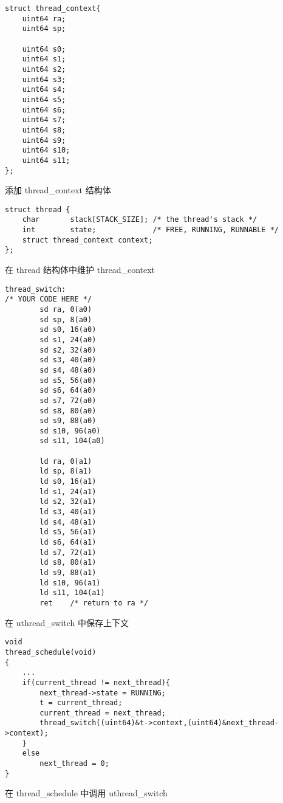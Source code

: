 \begin{listing}[!htb]
	\begin{verbatim}
struct thread_context{
    uint64 ra;
    uint64 sp;
    
    uint64 s0;
    uint64 s1;
    uint64 s2;
    uint64 s3;
    uint64 s4;
    uint64 s5;
    uint64 s6;
    uint64 s7;
    uint64 s8;
    uint64 s9;
    uint64 s10;
    uint64 s11;
};
	\end{verbatim}
	\caption{添加 thread\_context 结构体}\label{lst:add_struct_thread_context}
\end{listing}

\begin{listing}[!htb]
	\begin{verbatim}
struct thread {
    char       stack[STACK_SIZE]; /* the thread's stack */
    int        state;             /* FREE, RUNNING, RUNNABLE */
    struct thread_context context;
};
	\end{verbatim}
	\caption{在 thread 结构体中维护 thread\_context}\label{lst:add_thread_context_to_thread}
\end{listing}

\begin{listing}[!htb]
	\begin{verbatim}
thread_switch:
/* YOUR CODE HERE */
        sd ra, 0(a0)
        sd sp, 8(a0)
        sd s0, 16(a0)
        sd s1, 24(a0)
        sd s2, 32(a0)
        sd s3, 40(a0)
        sd s4, 48(a0)
        sd s5, 56(a0)
        sd s6, 64(a0)
        sd s7, 72(a0)
        sd s8, 80(a0)
        sd s9, 88(a0)
        sd s10, 96(a0)
        sd s11, 104(a0)

        ld ra, 0(a1)
        ld sp, 8(a1)
        ld s0, 16(a1)
        ld s1, 24(a1)
        ld s2, 32(a1)
        ld s3, 40(a1)
        ld s4, 48(a1)
        ld s5, 56(a1)
        ld s6, 64(a1)
        ld s7, 72(a1)
        ld s8, 80(a1)
        ld s9, 88(a1)
        ld s10, 96(a1)
        ld s11, 104(a1)
        ret    /* return to ra */
	\end{verbatim}
	\caption{在 uthread\_switch 中保存上下文}\label{lst:uthread_switch}
\end{listing}

\begin{listing}[!htb]
	\begin{verbatim}
void 
thread_schedule(void)
{
    ...
    if(current_thread != next_thread){
        next_thread->state = RUNNING;
        t = current_thread;
        current_thread = next_thread;
        thread_switch((uint64)&t->context,(uint64)&next_thread->context);
    }
    else 
        next_thread = 0;
}
	\end{verbatim}
	\caption{在 thread\_schedule 中调用 uthread\_switch}\label{lst:use_thread_schedule_in_uthread_switch}
\end{listing}

